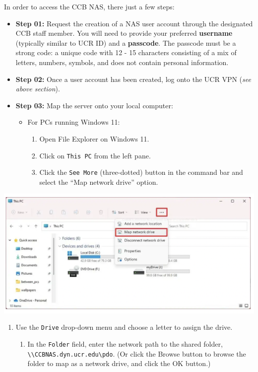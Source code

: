 \documentclass[
]{book}
\providecommand{\tightlist}{%
  \setlength{\itemsep}{0pt}\setlength{\parskip}{0pt}}
\begin{document}
In order to access the CCB NAS, there just a few steps:

\begin{itemize}
\item
  \textbf{Step 01:} Request the creation of a NAS user account through the designated CCB staff member. You will need to provide your preferred \textbf{username} (typically similar to UCR ID) and a \textbf{passcode}. The passcode must be a strong code: a unique code with 12 - 15 characters consisting of a mix of letters, numbers, symbols, and does not contain personal information.
\item
  \textbf{Step 02:} Once a user account has been created, log onto the UCR VPN (\emph{see above section}).
\item
  \textbf{Step 03:} Map the server onto your local computer:

  \begin{itemize}
  \tightlist
  \item
    For PCs running Windows 11:

    \begin{enumerate}
    \def\labelenumi{\arabic{enumi}.}
    \tightlist
    \item
      Open File Explorer on Windows 11.
    \item
      Click on \texttt{This\ PC} from the left pane.
    \item
      Click the \texttt{See\ More} (three-dotted) button in the command bar and select the ``Map network drive'' option.
    \end{enumerate}
  \end{itemize}
\end{itemize}

\begin{flushleft}\includegraphics[width=0.8\linewidth]{images/nas_map} \end{flushleft}

\begin{enumerate}
\def\labelenumi{\arabic{enumi}.}
\setcounter{enumi}{3}
\tightlist
\item
  Use the \texttt{Drive} drop-down menu and choose a letter to assign the drive.

  \begin{enumerate}
  \def\labelenumii{\arabic{enumii}.}
  \setcounter{enumii}{4}
  \tightlist
  \item
    In the \texttt{Folder} field, enter the network path to the shared folder, \texttt{\textbackslash{}\textbackslash{}CCBNAS.dyn.ucr.edu\textbackslash{}pdo}. (Or click the Browse button to browse the folder to map as a network drive, and click the OK button.)
  \end{enumerate}
\end{enumerate}
\end{document}
